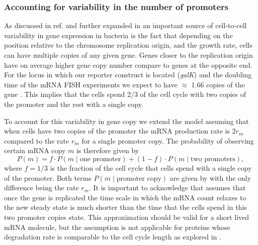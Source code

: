 \subsubsection*{Accounting for variability in the number of promoters}

As discussed in ref. \cite{Jones2014a} and further expanded in
\cite{Peterson2015} an important source of cell-to-cell variability in gene
expression in bacteria is the fact that depending on the position relative to
the chromosome replication origin, and the growth rate, cells can have multiple
copies of any given gene. Genes closer to the replication origin have on average
higher gene copy number compare to genes at the opposite end. For the locus in
which our reporter construct is located (\textit{galK}) and the doubling time of
the mRNA FISH experiments we expect to have $\approx$ 1.66 copies of the gene
\cite{Jones2014a, Bremer1996}. This implies that the cells spend 2/3 of the cell
cycle with two copies of the promoter and the rest with a single copy.

To account for this variability in gene copy we extend the model assuming that
when cells have two copies of the promoter the mRNA production rate is $2 r_m$
compared to the rate $r_m$ for a single promoter copy. The probability of
observing certain mRNA copy $m$ is therefore given by
\begin{equation}
  P(m) = f \cdot P(m \mid \text{one promoter}) +
  (1 - f) \cdot P(m \mid \text{two promoters}),
  \label{seq_prob_multipromoter}
\end{equation}
where $f = 1/3$ is the fraction of the cell cycle that cells spend with a single
copy of the promoter. Both terms $P(m \mid \text{promoter copy})$ are given by
 with the only difference being the rate $r_m$. It is
important to acknowledge that  assumes that once
the gene is replicated the time scale in which the mRNA count relaxes to the new
steady state is much shorter than the time that the cells spend in this two
promoter copies state. This approximation should be valid for a short lived mRNA
molecule, but the assumption is not applicable for proteins whose degradation
rate is comparable to the cell cycle length as explored in
.

